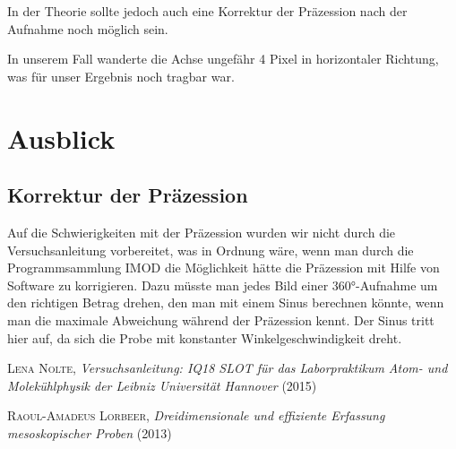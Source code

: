 In der Theorie sollte jedoch auch eine Korrektur der Präzession nach der Aufnahme noch möglich sein.

In unserem Fall wanderte die Achse ungefähr 4 Pixel in horizontaler Richtung, was für unser Ergebnis noch tragbar war.

\section{Ausblick}
\subsection{Korrektur der Präzession}
Auf die Schwierigkeiten mit der Präzession wurden wir nicht durch die Versuchsanleitung \cite{Anleitung} vorbereitet, was in Ordnung wäre, wenn man durch die Programmsammlung IMOD die Möglichkeit hätte die Präzession mit Hilfe von Software zu korrigieren.
Dazu müsste man jedes Bild einer 360°-Aufnahme um den richtigen Betrag drehen, den man mit einem Sinus berechnen könnte, wenn man die maximale Abweichung während der Präzession kennt.
Der Sinus tritt hier auf, da sich die Probe mit konstanter Winkelgeschwindigkeit dreht.

\clearpage
\listoffigures
\begin{thebibliography}{99}
 \textsc{Lena Nolte}, \emph{Versuchsanleitung: IQ18 SLOT für das Laborpraktikum Atom- und Molekühlphysik
der Leibniz Universität Hannover} (2015) 

 \textsc{Raoul-Amadeus Lorbeer}, \emph{Dreidimensionale und effiziente Erfassung mesoskopischer Proben} (2013) 
\end{thebibliography}




